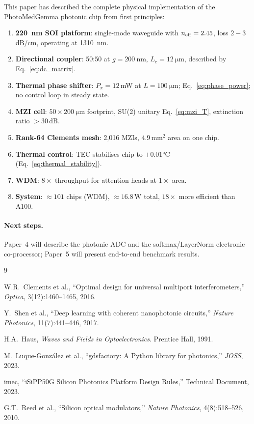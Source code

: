 \documentclass[12pt, a4paper]{article}
\begin{document}
This paper has described the complete physical implementation of the
PhotoMedGemma photonic chip from first principles:

\begin{enumerate}
  \item \textbf{\SI{220}{\nano\metre} SOI platform}: single-mode waveguide with
    $n_{\rm eff}=2.45$, loss $2-3$\,dB/cm, operating at \SI{1310}{\nano\metre}.
  \item \textbf{Directional coupler}: 50:50 at $g=\SI{200}{\nano\metre}$,
    $L_c=\SI{12}{\micro\metre}$, described by Eq.~\eqref{eq:dc_matrix}.
  \item \textbf{Thermal phase shifter}: $P_\pi = 12$\,mW at
    $L=\SI{100}{\micro\metre}$; Eq.~\eqref{eq:phase_power}; no control loop
    in steady state.
  \item \textbf{MZI cell}: $50\times\SI{200}{\micro\metre}$ footprint,
    SU(2) unitary Eq.~\eqref{eq:mzi_T}, extinction ratio $>30$\,dB.
  \item \textbf{Rank-64 Clements mesh}: 2,016 MZIs,
    $4.9\,\mathrm{mm}^2$ area on one chip.
  \item \textbf{Thermal control}: TEC stabilises chip to $\pm 0.01$°C
    (Eq.~\eqref{eq:thermal_stability}).
  \item \textbf{WDM}: $8\times$ throughput for attention heads at $1\times$ area.
  \item \textbf{System}: $\approx101$ chips (WDM), $\approx16.8$\,W total,
    $18\times$ more efficient than A100.
\end{enumerate}

\paragraph{Next steps.}
Paper~4 will describe the photonic ADC and the softmax/LayerNorm
electronic co-processor; Paper~5 will present end-to-end benchmark results.


\begin{thebibliography}{9}

W.R.\ Clements et al., ``Optimal design for universal multiport
interferometers,'' \textit{Optica}, 3(12):1460--1465, 2016.

Y.\ Shen et al., ``Deep learning with coherent nanophotonic circuits,''
\textit{Nature Photonics}, 11(7):441--446, 2017.

H.A.\ Haus, \textit{Waves and Fields in Optoelectronics}.
Prentice Hall, 1991.

M.\ Luque-Gonz\'{a}lez et al., ``gdsfactory: A Python library for photonics,''
\textit{JOSS}, 2023.

imec, ``iSiPP50G Silicon Photonics Platform Design Rules,''
Technical Document, 2023.

G.T.\ Reed et al., ``Silicon optical modulators,''
\textit{Nature Photonics}, 4(8):518--526, 2010.

\end{thebibliography}
\end{document}
